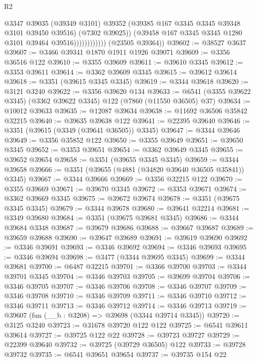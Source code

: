 \begin{lexlean}{R2}
\begin{coremodule}
                              @3347
                              @39035
                              (@39349 @3101)
                              @39352
                              (@39385 @167 @3345 @3345 @39348 @3101 @39450 @39516)
                              (@7302 @39025))
                            (@39458 @167 @3345 @3345 @1280 @3101 @39464 @39516))))))))))))
      (@23505 @39364))
@39602 := @38527 @3637
@39607 := @3466 @39341 @1870 @1911 @1926 @39071
@39609 := @3356 @36516 @122
@39610 := @3355 @39609
@39611 := @39610 @3345
@39612 := @3353 @39611
@39614 := @3362 @39609 @3345
@39615 := @39612 @39614
@39618 := @3351 (@39615 @3345 @3345)
@39619 := @3344 @39618
@39620 := @3121 @3240
@39622 := @3356 @39620 @134
@39633 := @6541 (@3355 @39622 @3345) (@3362 @39622 @3345) @122 (@7860 (@11550 @36505) @37)
@39634 := @10012 @39633
@39635 := @12087 @39634
@39638 := @11692 @36506 @35842 @32215
@39640 := @39635 @39638 @122
@39641 := @22395 @39640
@39646 := @3351 (@39615 (@3349 (@39641 @36505)) @3345)
@39647 := @3344 @39646
@39649 := @3356 @35852 @122
@39650 := @3355 @39649
@39651 := @39650 @3345
@39652 := @3353 @39651
@39654 := @3362 @39649 @3345
@39655 := @39652 @39654
@39658 := @3351 (@39655 @3345 @3345)
@39659 := @3344 @39658
@39666 := @3351 (@39655 (@4881 (@34820 @39640 @36505 @35841)) @3345)
@39667 := @3344 @39666
@39669 := @3356 @32215 @122
@39670 := @3355 @39669
@39671 := @39670 @3345
@39672 := @3353 @39671
@39674 := @3362 @39669 @3345
@39675 := @39672 @39674
@39678 := @3351 (@39675 @3345 @3345)
@39679 := @3344 @39678
@39680 := @39641 @32214
@39681 := @3349 @39680
@39684 := @3351 (@39675 @39681 @3345)
@39686 := @3344 @39684 @3348
@39687 := @39679 @39686
@39688 := @39667 @39687
@39689 := @39659 @39688
@39690 := @39647 @39689
@39691 := @39619 @39690
@39692 := @3346 @39691
@39693 := @3346 @39692
@39694 := @3346 @39693
@39695 := @3346 @39694
@39698 := @3477 (@3344 @39695 @3345)
@39699 := @3344 @39681
@39700 := @6487 @32215
@39701 := @3366 @39700
@39703 := @3344 @39701 @3345
@39704 := @3346 @39703
@39705 := @39699 @39704
@39706 := @3346 @39705
@39707 := @3346 @39706
@39708 := @3346 @39707
@39709 := @3346 @39708
@39710 := @3346 @39709
@39711 := @3346 @39710
@39712 := @3346 @39711
@39713 := @3346 @39712
@39714 := @3346 @39713
@39719 := @39607 (fun (__b : @3208) => @39698 (@3344 @39714 @3345))
@39720 := @3125 @3240
@39723 := @31678 @39720 @122 @122
@39725 := @6541 @39611 @39614
@39727 := @39725 @122 @22
@39728 := @39723 @39727
@39729 := @22399 @39640
@39732 := @39725 (@39729 @36505) @122
@39733 := @39728 @39732
@39735 := @6541 @39651 @39654
@39737 := @39735 @154 @22

\end{coremodule}
\end{lexlean}
